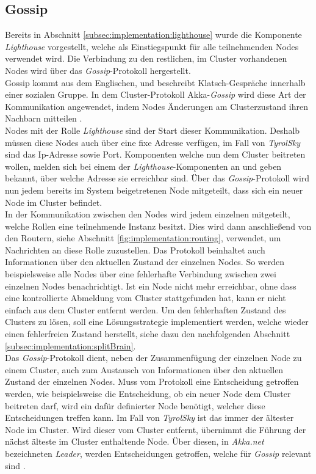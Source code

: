 \subsection{Gossip}
\label{subsec:implementation:gossip}
Bereits in Abschnitt \ref{subsec:implementation:lighthouse} wurde die Komponente \textit{Lighthouse} vorgestellt, welche als Einstiegspunkt für alle teilnehmenden Nodes verwendet wird. Die Verbindung zu den restlichen, im Cluster vorhandenen Nodes wird über das \textit{Gossip}-Protokoll hergestellt. \\
Gossip kommt aus dem Englischen, und beschreibt Klatsch-Gespräche innerhalb einer sozialen Gruppe. 
In dem Cluster-Protokoll Akka-\textit{Gossip} wird diese Art der Kommunikation angewendet, indem Nodes Änderungen am Clusterzustand ihren Nachbarn mitteilen \citep{Akka.netCommunityAkka.NETDocumentation}. \\
Nodes mit der Rolle \textit{Lighthouse} sind der Start dieser Kommunikation. Deshalb müssen diese Nodes auch über eine fixe Adresse verfügen, im Fall von \textit{TyrolSky} sind das Ip-Adresse sowie Port. Komponenten welche nun dem Cluster beitreten wollen, melden sich bei einem der \textit{Lighthouse}-Komponenten an und geben bekannt, über welche Adresse sie erreichbar sind. Über das \textit{Gossip}-Protokoll wird nun jedem bereits im System beigetretenen Node mitgeteilt, dass sich ein neuer Node im Cluster befindet. \\
In der Kommunikation zwischen den Nodes wird jedem einzelnen mitgeteilt, welche Rollen eine teilnehmende Instanz besitzt. Dies wird dann anschließend von den Routern, siehe Abschnitt \ref{fig:implementation:routing}, verwendet, um Nachrichten an diese Rolle zuzustellen. Das Protokoll beinhaltet auch Informationen über den aktuellen Zustand der einzelnen Nodes. So werden beispielsweise alle Nodes über eine fehlerhafte Verbindung zwischen zwei einzelnen Nodes benachrichtigt. Ist ein Node nicht mehr erreichbar, ohne dass eine kontrollierte Abmeldung vom Cluster stattgefunden hat, kann er nicht einfach aus dem Cluster entfernt werden. Um den fehlerhaften Zustand des Clusters zu lösen, soll eine Lösungsstrategie implementiert werden, welche wieder einen fehlerfreien Zustand herstellt, siehe dazu den nachfolgenden Abschnitt \ref{subsec:implementation:splitBrain}. \\ 
Das \textit{Gossip}-Protokoll dient, neben der Zusammenfügung der einzelnen Node zu einem Cluster, auch zum Austausch von Informationen über den aktuellen Zustand der einzelnen Nodes. Muss vom Protokoll eine Entscheidung getroffen werden, wie beispielsweise die Entscheidung, ob ein neuer Node dem Cluster beitreten darf, wird ein dafür definierter Node benötigt, welcher diese Entscheidungen treffen kann. Im Fall von \textit{TyrolSky} ist das immer der ältester Node im Cluster. Wird dieser vom Cluster entfernt, übernimmt die Führung der nächst älteste im Cluster enthaltende Node. Über diesen, in \textit{Akka.net} bezeichneten \textit{Leader}, werden Entscheidungen getroffen, welche für \textit{Gossip} relevant sind \citep{akkaInAction}. 

